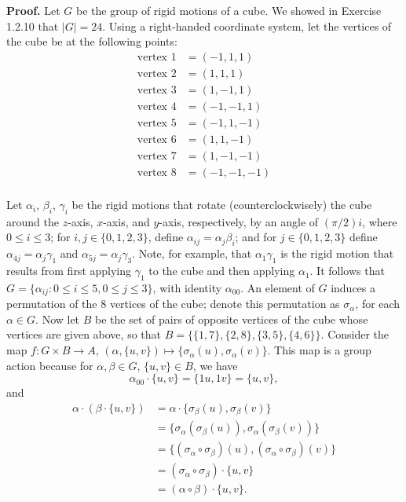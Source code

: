 \begin{enumerate}
      \textbf{Proof.} Let $G$ be the group of rigid motions of a cube. We showed
      in Exercise 1.2.10 that $|G| = 24$. Using a right-handed coordinate
      system, let the vertices of the cube be at the following points:
      \begin{align*}
         \text{vertex 1} &= (-1, 1, 1) \\
         \text{vertex 2} &= (1, 1, 1) \\
         \text{vertex 3} &= (1, -1, 1) \\
         \text{vertex 4} &= (-1, -1, 1) \\
         \text{vertex 5} &= (-1, 1, -1) \\
         \text{vertex 6} &= (1, 1, -1) \\
         \text{vertex 7} &= (1, -1, -1) \\
         \text{vertex 8} &= (-1, -1, -1) \\
      \end{align*} 

      Let $\alpha_i$, $\beta_i$, $\gamma_i$ be the rigid motions that rotate 
      (counterclockwisely) the cube around the $z$-axis, $x$-axis, and $y$-axis,
      respectively, by an angle of $(\pi/2)i$, where $0 \le i \le 3$; for
      $i, j \in \{0, 1, 2, 3\}$, define $\alpha_{ij} = \alpha_{j}\beta_i$; and
      for $j \in \{0, 1, 2, 3\}$ define $\alpha_{4j} = \alpha_{j}\gamma_1$ and
      $\alpha_{5j} = \alpha_{j}\gamma_3$. Note, for example, that
      $\alpha_1\gamma_1$ is the rigid motion that results from first applying
      $\gamma_1$ to the cube and then applying $\alpha_1$. It follows that
      $G = \{\alpha_{ij} : 0 \le i \le 5, 0 \le j \le 3\}$, with identity
      $\alpha_{00}$. An element of $G$ induces a permutation of the 8 vertices
      of the cube; denote this permutation as $\sigma_\alpha$, for each
      $\alpha \in G$. Now let $B$ be the set of pairs of opposite vertices of
      the cube whose vertices are given above, so that
      $B = \{\{1, 7\}, \{2, 8\}, \{3, 5\}, \{4, 6\}\}$. Consider the map
      $f : G \times B \rightarrow A$,
      $(\alpha, \{u, v\}) \mapsto \{\sigma_\alpha(u), \sigma_\alpha(v)\}$. This
      map is a group action because for $\alpha, \beta \in G$, $\{u, v\} \in B$,
      we have
      $$\alpha_{00} \cdot \{u, v\} = \{1u, 1v\} = \{u, v\},$$
      and
      \begin{align*}
         \alpha \cdot (\beta \cdot \{u, v\}) &=
         \alpha \cdot \{\sigma_\beta(u), \sigma_\beta(v)\} \\
         &= \{\sigma_\alpha(\sigma_\beta(u)), \sigma_\alpha(\sigma_\beta(v))\}\\
         &= \{(\sigma_\alpha\circ\sigma_\beta)(u),
              (\sigma_\alpha\circ\sigma_\beta)(v)\} \\
                     &= (\sigma_\alpha\circ\sigma_\beta) \cdot \{u, v\} \\
                     &= (\alpha\circ\beta) \cdot \{u, v\}.
      \end{align*}


\end{enumerate}
